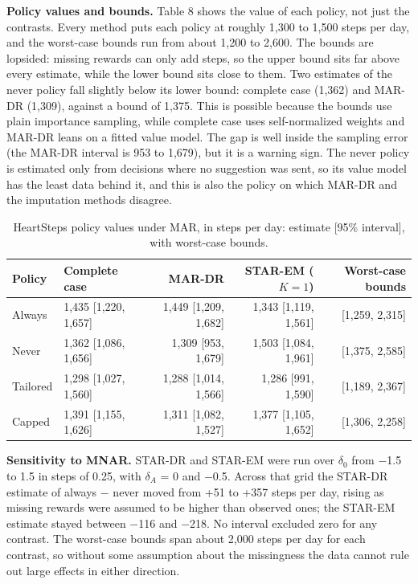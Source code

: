 \documentclass[12pt]{article}
\begin{document}
\textbf{Policy values and bounds.} Table 8 shows the value of each policy, not just the contrasts. Every method puts each policy at roughly 1,300 to 1,500 steps per day, and the worst-case bounds run from about 1,200 to 2,600. The bounds are lopsided: missing rewards can only add steps, so the upper bound sits far above every estimate, while the lower bound sits close to them. Two estimates of the never policy fall slightly below its lower bound: complete case (1,362) and MAR-DR (1,309), against a bound of 1,375. This is possible because the bounds use plain importance sampling, while complete case uses self-normalized weights and MAR-DR leans on a fitted value model. The gap is well inside the sampling error (the MAR-DR interval is 953 to 1,679), but it is a warning sign. The never policy is estimated only from decisions where no suggestion was sent, so its value model has the least data behind it, and this is also the policy on which MAR-DR and the imputation methods disagree.

\begin{table}[!htbp]\centering\footnotesize
\caption{HeartSteps policy values under MAR, in steps per day: estimate [95\% interval], with worst-case bounds.}
\begin{tabular}{llrrr}
\toprule
\textbf{Policy} & \textbf{Complete case} & \textbf{MAR-DR} & \textbf{STAR-EM ($K=1$)} & \textbf{Worst-case bounds} \\
\midrule
Always & 1,435 [1,220, 1,657] & 1,449 [1,209, 1,682] & 1,343 [1,119, 1,561] & [1,259, 2,315] \\
Never & 1,362 [1,086, 1,656] & 1,309 [953, 1,679] & 1,503 [1,084, 1,961] & [1,375, 2,585] \\
Tailored & 1,298 [1,027, 1,560] & 1,288 [1,014, 1,566] & 1,286 [991, 1,590] & [1,189, 2,367] \\
Capped & 1,391 [1,155, 1,626] & 1,311 [1,082, 1,527] & 1,377 [1,105, 1,652] & [1,306, 2,258] \\
\bottomrule
\end{tabular}
\end{table}

\textbf{Sensitivity to MNAR.} STAR-DR and STAR-EM were run over $\delta_0$ from $-$1.5 to 1.5 in steps of 0.25, with $\delta_A$ = 0 and $-$0.5. Across that grid the STAR-DR estimate of always $-$ never moved from +51 to +357 steps per day, rising as missing rewards were assumed to be higher than observed ones; the STAR-EM estimate stayed between $-$116 and $-$218. No interval excluded zero for any contrast. The worst-case bounds span about 2,000 steps per day for each contrast, so without some assumption about the missingness the data cannot rule out large effects in either direction.
\end{document}
